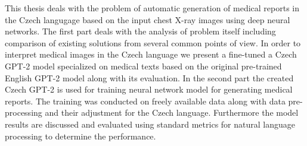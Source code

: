 \documentclass[12pt]{report}
\begin{document}

This thesis deals with the problem of automatic generation of medical reports in the Czech langugage based on the input chest X-ray images using deep neural networks. The first part deals with the analysis of problem itself including comparison of existing solutions from several common points of view. In order to interpret medical images in the Czech language we present a fine-tuned a Czech GPT-2 model specialized on medical texts based on the original pre-trained English GPT-2 model along with its evaluation. In the second part the created Czech GPT-2 is used for training neural network model for generating medical reports. The training was conducted on freely available data along with data pre-processing and their adjustment for the Czech language. Furthermore the model results are discussed and evaluated using standard metrics for natural language processing to determine the performance.
\end{document}
